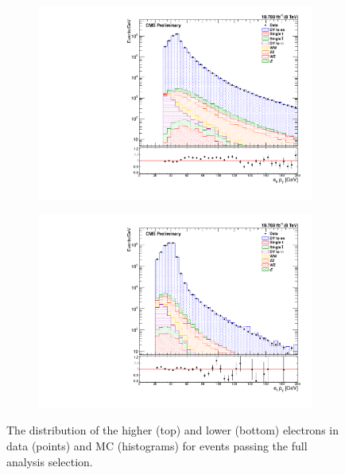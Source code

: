 \begin{figure}[!htbp]
    \centering
    \begin{subfigure}[b]{0.65\textwidth}
        \includegraphics[width=\textwidth]{figures/e0_pt.pdf}
        \caption{}
        \label{fig:e_pt_high}
    \end{subfigure}
    \begin{subfigure}[b]{0.65\textwidth}
        \includegraphics[width=\textwidth]{figures/e1_pt.pdf}
        \caption{}
        \label{fig:e_pt_low}
    \end{subfigure}
    \caption{
        The \pt distribution of the higher (top) and lower (bottom) \pt
        electrons in data (points) and MC (histograms) for events passing the
        full analysis selection.
    }
    \label{fig:e_pt}
\end{figure}


